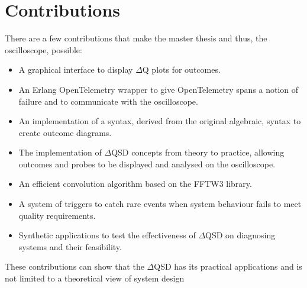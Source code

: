 \section{Contributions}
    There are a few contributions that make the master thesis and thus, the oscilloscope, possible:
    \begin{itemize}
        \item A graphical interface to display $\Delta$Q plots for outcomes.
        \item An Erlang OpenTelemetry wrapper to give OpenTelemetry spans a notion of failure and to communicate with the oscilloscope.
        \item An implementation of a syntax, derived from the original algebraic, syntax to create outcome diagrams. 
        \item The implementation of $\Delta$QSD concepts from theory to practice, allowing outcomes and probes to be displayed and analysed on the oscilloscope.
        \item An efficient convolution algorithm based on the FFTW3 library.
        \item A system of triggers to catch rare events when system behaviour fails to meet quality requirements.
        \item Synthetic applications to test the effectiveness of $\Delta$QSD on diagnosing systems and their feasibility.
    \end{itemize}
    These contributions can show that the $\Delta$QSD has its practical applications and is not limited to a theoretical view of system design

